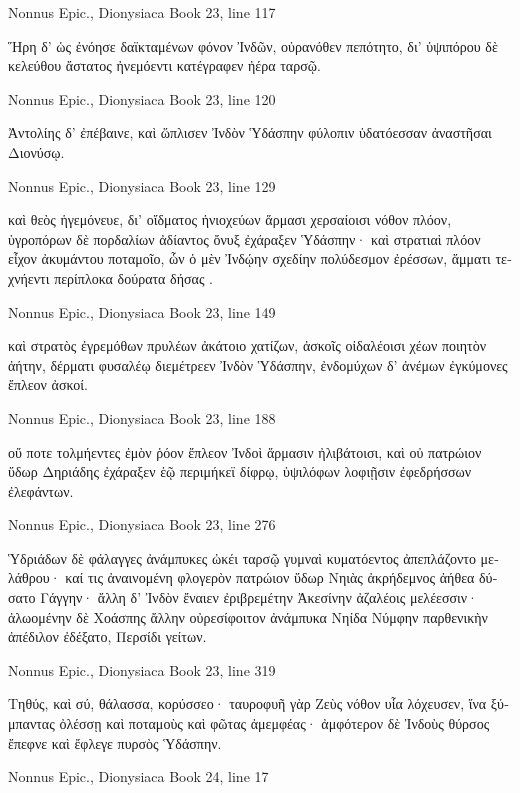 \documentclass[12pt,letterpaper,twoside,final]{memoir}
\begin{document}
\begin{greek}
Nonnus Epic., Dionysiaca 
Book 23, line 117

Ἥρη δ' ὡς ἐνόησε δαϊκταμένων φόνον Ἰνδῶν, 
οὐρανόθεν πεπότητο, δι' ὑψιπόρου δὲ κελεύθου 
ἄστατος ἠνεμόεντι κατέγραφεν ἠέρα ταρσῷ. 



Nonnus Epic., Dionysiaca 
Book 23, line 120

Ἀντολίης δ' ἐπέβαινε, καὶ ὥπλισεν Ἰνδὸν Ὑδάσπην 
φύλοπιν ὑδατόεσσαν ἀναστῆσαι Διονύσῳ. 



Nonnus Epic., Dionysiaca 
Book 23, line 129

καὶ θεὸς ἡγεμόνευε, δι' οἴδματος ἡνιοχεύων 
ἅρμασι χερσαίοισι νόθον πλόον, ὑγροπόρων δὲ 
πορδαλίων ἀδίαντος ὄνυξ ἐχάραξεν Ὑδάσπην· 
καὶ στρατιαὶ πλόον εἶχον ἀκυμάντου ποταμοῖο, 
ὧν ὁ μὲν Ἰνδῴην σχεδίην πολύδεσμον ἐρέσσων, 
ἅμματι τεχνήεντι περίπλοκα δούρατα δήσας . 



Nonnus Epic., Dionysiaca 
Book 23, line 149

καὶ στρατὸς ἐγρεμόθων πρυλέων ἀκάτοιο χατίζων, 
ἀσκοῖς οἰδαλέοισι χέων ποιητὸν ἀήτην, 
δέρματι φυσαλέῳ διεμέτρεεν Ἰνδὸν Ὑδάσπην, 
ἐνδομύχων δ' ἀνέμων ἐγκύμονες ἔπλεον ἀσκοί. 



Nonnus Epic., Dionysiaca 
Book 23, line 188

οὔ ποτε τολμήεντες ἐμὸν ῥόον ἔπλεον Ἰνδοὶ 
ἅρμασιν ἠλιβάτοισι, καὶ οὐ πατρώιον ὕδωρ 
Δηριάδης ἐχάραξεν ἑῷ περιμήκεϊ δίφρῳ, 
ὑψιλόφων λοφιῇσιν ἐφεδρήσσων ἐλεφάντων. 



Nonnus Epic., Dionysiaca 
Book 23, line 276

Ὑδριάδων δὲ φάλαγγες ἀνάμπυκες ὠκέι ταρσῷ 
γυμναὶ κυματόεντος ἀπεπλάζοντο μελάθρου· 
καί τις ἀναινομένη φλογερὸν πατρώιον ὕδωρ 
Νηιὰς ἀκρήδεμνος ἀήθεα δύσατο Γάγγην· 
ἄλλη δ' Ἰνδὸν ἔναιεν ἐριβρεμέτην Ἀκεσίνην 
ἀζαλέοις μελέεσσιν· ἀλωομένην δὲ Χοάσπης 
ἄλλην οὐρεσίφοιτον ἀνάμπυκα Νηίδα Νύμφην 
παρθενικὴν ἀπέδιλον ἐδέξατο, Περσίδι γείτων. 



Nonnus Epic., Dionysiaca 
Book 23, line 319

Τηθύς, καὶ σύ, θάλασσα, κορύσσεο· ταυροφυῆ γὰρ 
Ζεὺς νόθον υἷα λόχευσεν, ἵνα ξύμπαντας ὀλέσσῃ 
καὶ ποταμοὺς καὶ φῶτας ἀμεμφέας· ἀμφότερον δὲ 
Ἰνδοὺς θύρσος ἔπεφνε καὶ ἔφλεγε πυρσὸς Ὑδάσπην. 



Nonnus Epic., Dionysiaca 
Book 24, line 17


\end{greek}
\end{document}
